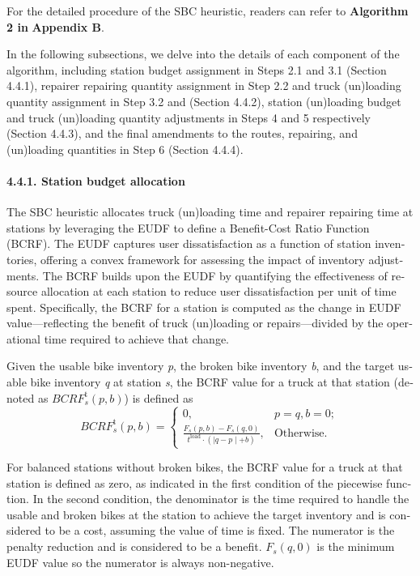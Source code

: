 \documentclass[
  english,
]{article}
\begin{document}
\begin{otherlanguage}{english}
\protect{}\label{p0455}
For the detailed procedure of the SBC heuristic, readers can refer to \textbf{Algorithm 2 in}
\textbf{Appendix B}.

\protect{}\label{p0460}
In the following subsections, we delve into the details of each component of the algorithm,
including station budget assignment in Steps 2.1 and 3.1 (Section 4.4.1), repairer repairing
quantity assignment in Step 2.2 and truck (un)loading quantity assignment in Step 3.2 and (Section
4.4.2), station (un)loading budget and truck (un)loading quantity adjustments in Steps 4 and 5
respectively (Section 4.4.3), and the final amendments to the routes, repairing, and (un)loading
quantities in Step 6 (Section 4.4.4).

\protect{}\label{s0070}
\paragraph{4.4.1. Station budget allocation}\label{st090}

\protect{}\label{p0465}
The SBC heuristic allocates truck (un)loading time and repairer repairing time at stations by
leveraging the EUDF to define a Benefit-Cost Ratio Function (BCRF). The EUDF captures user
dissatisfaction as a function of station inventories, offering a convex framework for assessing the
impact of inventory adjustments. The BCRF builds upon the EUDF by quantifying the effectiveness of
resource allocation at each station to reduce user dissatisfaction per unit of time spent.
Specifically, the BCRF for a station is computed as the change in EUDF value---reflecting the
benefit of truck (un)loading or repairs---divided by the operational time required to achieve that
change.

\protect{}\label{p0470}
Given the usable bike inventory \emph{p}, the broken bike inventory \emph{b}, and the target usable
bike inventory \emph{q} at station \emph{s}, the BCRF value for a truck at that station (denoted as
\(\mathit{BCR}F_{s}^{\text{t}}\left( {p,b} \right)\)) is defined
as\[\tag{68}\mathit{BCR}F_{s}^{\text{t}}\left( {p,b} \right) = \left\{ \begin{array}{lc}
{0,} & {p = q,b = 0;} \\
{\frac{F_{s}\left( {p,b} \right) - F_{s}\left( {q,0} \right)}{t^{\text{load}} \cdot \left( \left| q - p \middle| + b \right. \right)},} & {\text{Otherwise}\text{.}}
\end{array} \right.\]

\protect{}\label{p0475}
For balanced stations without broken bikes, the BCRF value for a truck at that station is defined as
zero, as indicated in the first condition of the piecewise function. In the second condition, the
denominator is the time required to handle the usable and broken bikes at the station to achieve the
target inventory and is considered to be a cost, assuming the value of time is fixed. The numerator
is the penalty reduction and is considered to be a benefit. \(F_{s}\left( {q,0} \right)\) is the
minimum EUDF value so the numerator is always non-negative.


\end{otherlanguage}
\end{document}
